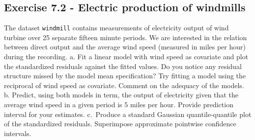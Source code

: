 \documentclass[]{book}
\theoremstyle{definition}
\theoremstyle{definition}
\theoremstyle{definition}
\theoremstyle{remark}
\begin{document}
\hypertarget{exercise-7.2---electric-production-of-windmills}{%
\subsection{Exercise 7.2 - Electric production of windmills}\label{exercise-7.2---electric-production-of-windmills}}

The dataset \texttt{windmill} contains measurements of electricity output of wind turbine over 25 separate
fifteen minute periods. We are interested in the relation between direct output and the average wind speed (measured in miles per hour) during
the recording.
a. Fit a linear model with wind speed as covariate and plot the standardized residuals against the fitted values. Do you notice any residual structure missed by the model mean specification? Try fitting a model using the reciprocal of wind speed as covariate. Comment on the adequacy of the models.
b. Predict, using both models in term, the output of electricity given that the average wind speed in a given period is 5 miles per hour. Provide prediction interval for your estimates.
c.~Produce a standard Gaussian quantile-quantile plot of the standardized residuals. Superimpose approximate pointwise confidence intervals.
\end{document}
